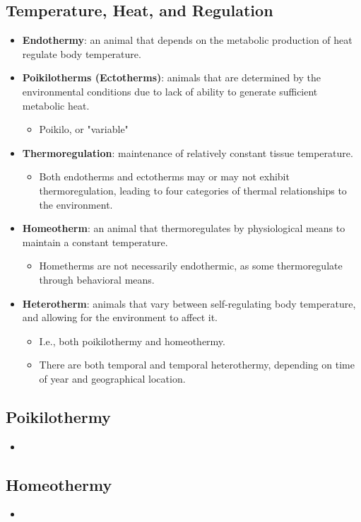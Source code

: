 \documentclass[12pt,a4paper]{article}
\begin{document}
\subsection{Temperature, Heat, and Regulation}
\begin{itemize}
    \item \textbf{Endothermy}: an animal that depends on the metabolic production of heat regulate body temperature.
    \item \textbf{Poikilotherms (Ectotherms)}: animals that are determined by the environmental conditions due to lack of ability to generate sufficient metabolic heat.
        \begin{itemize}
            \item Poikilo, or "variable"
        \end{itemize}
    \item \textbf{Thermoregulation}: maintenance of relatively constant tissue temperature.
        \begin{itemize}
            \item Both endotherms and ectotherms may or may not exhibit thermoregulation, leading to four categories of thermal relationships to the environment.
        \end{itemize}
    \item \textbf{Homeotherm}: an animal that thermoregulates by physiological means to maintain a constant temperature.
        \begin{itemize}
            \item Hometherms are not necessarily endothermic, as some thermoregulate through {\color{o-Sun}behavioral} means.
        \end{itemize}
    \item \textbf{Heterotherm}: animals that vary between self-regulating body temperature, and allowing for the environment to affect it.
        \begin{itemize}
            \item I.e., both poikilothermy and homeothermy.
            \item There are both temporal and temporal heterothermy, depending on time of year and geographical location.
        \end{itemize}
\end{itemize}

\subsection{Poikilothermy}
\begin{itemize}
    \item 
\end{itemize}

\subsection{Homeothermy}
\begin{itemize}
    \item 
\end{itemize}

\end{document}
